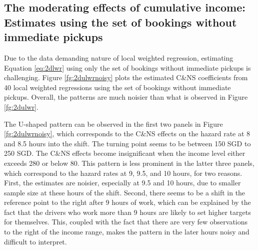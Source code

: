 \documentclass[reviewmode,AEJ]{AEA}
\begin{document}
\begin{appendices}
\begin{table}
\end{table}



\section{The moderating effects of cumulative income: Estimates using the set of bookings without immediate pickups}
\label{apx:CI}
Due to the data demanding nature of local weighted regression, estimating Equation \eqref{eq:2dlwr} using only the set of bookings without immediate pickups is challenging. Figure \ref{fg:2dulwrnoisy} plots the estimated C\&NS coefficients from 40 local weighted regressions using the set of bookings without immediate pickups. Overall, the patterns are much noisier than what is observed in Figure \ref{fg:2dulwr}. 

The U-shaped pattern can be observed in the first two panels in Figure \ref{fg:2dulwrnoisy}, which corresponds to the C\&NS effects on the hazard rate at 8 and 8.5 hours into the shift. The turning point seems to be between 150 SGD to 250 SGD. The C\&NS effects become insignificant when the income level either exceeds 280 or below 80. This pattern is less prominent in the latter three panels, which correspond to the hazard rates at 9, 9.5, and 10 hours, for two reasons. First, the estimates are noisier, especially at 9.5 and 10 hours, due to smaller sample size at these hours of the shift. Second, there seems to be a shift in the reference point  to the right after 9 hours of work, which can be explained by the fact that the drivers who work more than 9 hours are likely to set higher targets for themselves. This, coupled with the fact that there are very few observations to the right of the income range, makes the pattern in the later hours noisy and difficult to interpret. 




\end{appendices}
\end{document}
